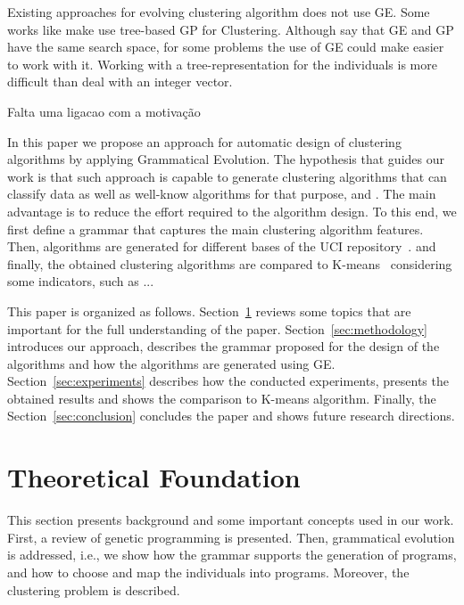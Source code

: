 \documentclass[conference,compsoc]{IEEEtran}
\begin{document}
Existing approaches for evolving clustering algorithm does not use GE. Some works like \cite{ahn2011genetic, xie2006population, boric2007genetic} make use tree-based GP for Clustering. Although \cite{harris2015comparison} say that GE and GP have the same search space, for some problems the use of GE could make easier to work with it. Working with a tree-representation for the individuals is more difficult than deal with an integer vector.


Falta uma ligacao com a motivação


In this paper we propose an approach for automatic design of clustering algorithms by applying Grammatical Evolution. The hypothesis that guides our work is that such approach is capable to generate clustering algorithms that can classify data as well as well-know algorithms for that purpose, and . The main advantage is to reduce the effort required to the algorithm design. To this end, we first define a grammar that captures the main clustering algorithm features. Then, algorithms are generated for different bases of the UCI repository~\cite{}. and finally, the obtained clustering algorithms are compared to K-means~\cite{} considering some indicators, such as ...



This paper is organized as follows. Section~\ref{sec:theoretical_foudation} reviews some topics that are important for the full understanding of the paper. Section~\ref{sec:methodology} introduces our approach,  describes the grammar proposed for the design of the algorithms and how the algorithms are generated using GE. Section~\ref{sec:experiments} describes how the conducted experiments,  presents the obtained results and shows the comparison to K-means algorithm. Finally, the Section~\ref{sec:conclusion} concludes the paper and shows future research directions.



\section{Theoretical Foundation} \label{sec:theoretical_foudation}

This section presents background and some important concepts used in our work. First, a review of genetic programming is presented. Then, grammatical evolution is addressed, i.e., we show how the grammar supports the generation of programs, and how to choose and map the individuals into programs. Moreover, the clustering problem is described.
\end{document}
